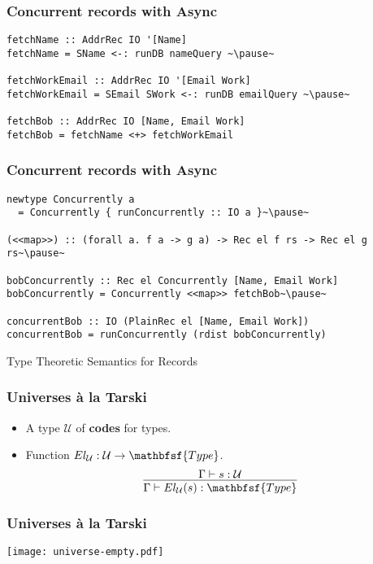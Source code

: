 \documentclass[tikz, 12pt]{beamer}
\def\Type{\mathbfsf{Type}}
\begin{document}
\begin{frame}[fragile]
  \frametitle{Concurrent records with Async}\pause

  \begin{lstlisting}
fetchName :: AddrRec IO '[Name]
fetchName = SName <-: runDB nameQuery ~\pause~

fetchWorkEmail :: AddrRec IO '[Email Work]
fetchWorkEmail = SEmail SWork <-: runDB emailQuery ~\pause~

fetchBob :: AddrRec IO [Name, Email Work]
fetchBob = fetchName <+> fetchWorkEmail
  \end{lstlisting}
\end{frame}

\begin{frame}[fragile]
  \frametitle{Concurrent records with Async}\pause

  \begin{lstlisting}
newtype Concurrently a
  = Concurrently { runConcurrently :: IO a }~\pause~

(<<map>>) :: (forall a. f a -> g a) -> Rec el f rs -> Rec el g rs~\pause~

bobConcurrently :: Rec el Concurrently [Name, Email Work]
bobConcurrently = Concurrently <<map>> fetchBob~\pause~

concurrentBob :: IO (PlainRec el [Name, Email Work])
concurrentBob = runConcurrently (rdist bobConcurrently)
  \end{lstlisting}
\end{frame}

\begin{frame}[fragile]
  \centerline{Type Theoretic Semantics for Records}
\end{frame}

\begin{frame}
  \frametitle{Universes \`a la Tarski}\pause
  \begin{itemize}
    \item A type $\mathcal{U}$ of \textbf{codes} for types.
      \pause
    \item Function $El_\mathcal{U} : \mathcal{U}\to\Type$.
      \pause
      \[
        \infer{
          \Gamma\vdash El_\mathcal{U}(s) : \Type
        }{
          \Gamma\vdash s : \mathcal{U}
        }
      \]
  \end{itemize}
\end{frame}

\begin{frame}
  \frametitle{Universes \`a la Tarski}
  \begin{center}
    \texttt{[image: universe-empty.pdf]}
  \end{center}
\end{frame}
\end{document}
